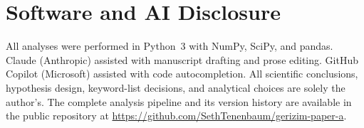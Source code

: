 \documentclass[12pt,a4paper]{article}
\begin{document}
\section*{Software and AI Disclosure}
All analyses were performed in Python~3 with NumPy, SciPy, and pandas.
Claude (Anthropic) assisted with manuscript drafting and prose editing.
GitHub Copilot (Microsoft) assisted with code autocompletion.
All scientific conclusions, hypothesis design, keyword-list decisions,
and analytical choices are solely the author's.
The complete analysis pipeline and its version history are available
in the public repository at
\url{https://github.com/SethTenenbaum/gerizim-paper-a}.
\end{document}

